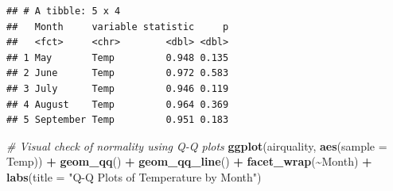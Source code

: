 \documentclass[
]{article}
\newenvironment{Shaded}{\begin{snugshade}}{\end{snugshade}}
\newcommand{\AttributeTok}[1]{\textcolor[rgb]{0.13,0.29,0.53}{#1}}
\newcommand{\CommentTok}[1]{\textcolor[rgb]{0.56,0.35,0.01}{\textit{#1}}}
\newcommand{\DecValTok}[1]{\textcolor[rgb]{0.00,0.00,0.81}{#1}}
\newcommand{\FunctionTok}[1]{\textcolor[rgb]{0.13,0.29,0.53}{\textbf{#1}}}
\newcommand{\NormalTok}[1]{#1}
\newcommand{\OtherTok}[1]{\textcolor[rgb]{0.56,0.35,0.01}{#1}}
\newcommand{\SpecialCharTok}[1]{\textcolor[rgb]{0.81,0.36,0.00}{\textbf{#1}}}
\newcommand{\StringTok}[1]{\textcolor[rgb]{0.31,0.60,0.02}{#1}}
\begin{document}
\begin{Shaded}
\end{Shaded}

\begin{verbatim}
## # A tibble: 5 x 4
##   Month     variable statistic     p
##   <fct>     <chr>        <dbl> <dbl>
## 1 May       Temp         0.948 0.135
## 2 June      Temp         0.972 0.583
## 3 July      Temp         0.946 0.119
## 4 August    Temp         0.964 0.369
## 5 September Temp         0.951 0.183
\end{verbatim}

\begin{Shaded}
\begin{Highlighting}[]
\CommentTok{\# Visual check of normality using Q{-}Q plots}
\FunctionTok{ggplot}\NormalTok{(airquality, }\FunctionTok{aes}\NormalTok{(}\AttributeTok{sample =}\NormalTok{ Temp)) }\SpecialCharTok{+}
  \FunctionTok{geom\_qq}\NormalTok{() }\SpecialCharTok{+}
  \FunctionTok{geom\_qq\_line}\NormalTok{() }\SpecialCharTok{+}
  \FunctionTok{facet\_wrap}\NormalTok{(}\SpecialCharTok{\textasciitilde{}}\NormalTok{Month) }\SpecialCharTok{+}
  \FunctionTok{labs}\NormalTok{(}\AttributeTok{title =} \StringTok{"Q{-}Q Plots of Temperature by Month"}\NormalTok{)}
\end{Highlighting}
\end{Shaded}
\end{document}
